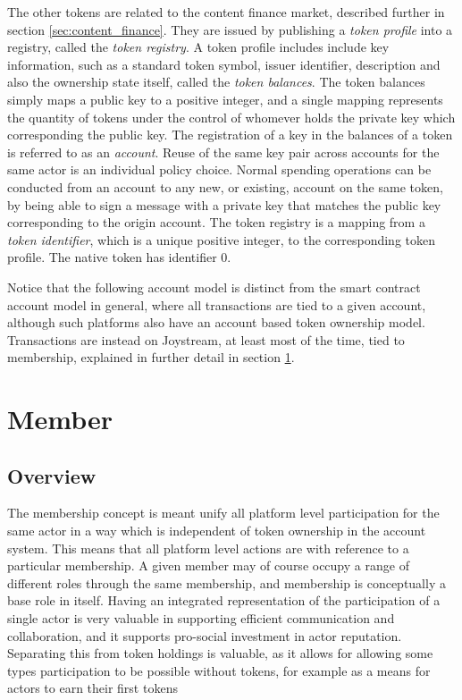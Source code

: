 \documentclass{article}
\begin{document}
The other tokens are related to the content finance market, described further in section \ref{sec:content_finance}. They are issued by publishing a \textit{token profile} into a registry, called the \textit{token registry}. A token profile includes include key information, such as a standard token symbol, issuer identifier, description and also the ownership state itself, called the \textit{token balances}. The token balances simply maps a public key to a positive integer, and a single mapping represents the quantity of tokens under the control of whomever holds the private key which corresponding the public key. The registration of a key in the balances of a token is referred to as an \textit{account}. Reuse of the same key pair across accounts for the same actor is an individual policy choice. Normal spending operations can be conducted from an account to any new, or existing, account on the same token, by being able to sign a message with a private key that matches the public key corresponding to the origin account. The token registry is a mapping from a \textit{token identifier}, which is a unique positive integer, to the corresponding token profile. The native token has identifier $0$.

Notice that the following account model is distinct from the smart contract account model in general, where all transactions are tied to a given account, although such platforms also have an account based token ownership model. Transactions are instead on Joystream, at least most of the time, tied to membership, explained in further detail in section \ref{sec:member}.

\section{Member} \label{sec:member}

\subsection{Overview}

The membership concept is meant unify all platform level participation for the same actor in a way which is independent of token ownership in the account system. This means that all platform level actions are with reference to a particular membership. A given member may of course occupy a range of different roles through the same membership, and membership is conceptually a base role in itself. Having an integrated representation of the participation of a single actor is very valuable in supporting efficient communication and collaboration, and it supports pro-social investment in actor reputation. Separating this from token holdings is valuable, as it allows for allowing some types participation to be possible without tokens, for example as a means for actors to earn their first tokens
\end{document}
